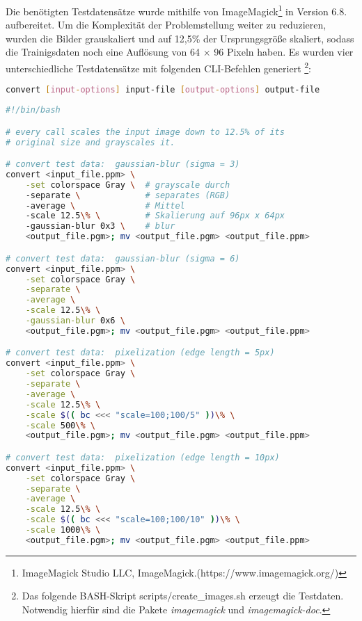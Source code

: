 Die benötigten Testdatensätze wurde mithilfe von ImageMagick\footnote{ImageMagick Studio LLC, ImageMagick.\newline(https://www.imagemagick.org/)} in Version 6.8. aufbereitet. Um die Komplexität der
Problemstellung weiter zu reduzieren, wurden die Bilder grauskaliert und auf 12,5\% der Ursprungsgröße skaliert, sodass
die Trainigsdaten noch eine Auflösung von 64 \(\times\) 96 Pixeln haben. Es wurden vier unterschiedliche Testdatensätze mit
folgenden CLI-Befehlen generiert \footnote{Das folgende BASH-Skript scripts/create\_images.sh erzeugt die
Testdaten. Notwendig hierfür sind die Pakete \textit{imagemagick} und \textit{imagemagick-doc}.}:


\begin{minipage}{\linewidth}

\begin{lstlisting}[language=bash,caption={convert - Synopsis}]
convert [input-options] input-file [output-options] output-file
\end{lstlisting}

\begin{lstlisting}[language=bash,caption={Testdatenerstellung - Graustufen}]
#!/bin/bash

# every call scales the input image down to 12.5% of its
# original size and grayscales it.

# convert test data:  gaussian-blur (sigma = 3)
convert <input_file.ppm> \
    -set colorspace Gray \  # grayscale durch
    -separate \             # separates (RGB)
    -average \              # Mittel
    -scale 12.5\% \         # Skalierung auf 96px x 64px
    -gaussian-blur 0x3 \    # blur
    <output_file.pgm>; mv <output_file.pgm> <output_file.ppm>

# convert test data:  gaussian-blur (sigma = 6)
convert <input_file.ppm> \
    -set colorspace Gray \
    -separate \
    -average \
    -scale 12.5\% \
    -gaussian-blur 0x6 \
    <output_file.pgm>; mv <output_file.pgm> <output_file.ppm>

# convert test data:  pixelization (edge length = 5px)
convert <input_file.ppm> \
    -set colorspace Gray \
    -separate \
    -average \
    -scale 12.5\% \
    -scale $(( bc <<< "scale=100;100/5" ))\% \
    -scale 500\% \
    <output_file.pgm>; mv <output_file.pgm> <output_file.ppm>

# convert test data:  pixelization (edge length = 10px)
convert <input_file.ppm> \
    -set colorspace Gray \
    -separate \
    -average \
    -scale 12.5\% \
    -scale $(( bc <<< "scale=100;100/10" ))\% \
    -scale 1000\% \
    <output_file.pgm>; mv <output_file.pgm> <output_file.ppm>
\end{lstlisting}
\end{minipage}